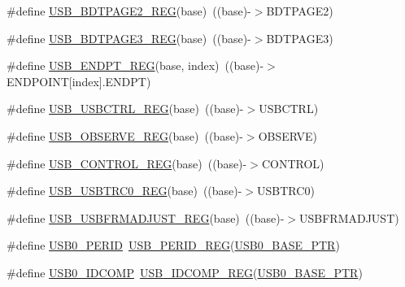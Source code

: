 \begin{DoxyCompactItemize}
\item 
\#define \hyperlink{group___u_s_b___register___accessor___macros_gab286bd6bd7c2c180c34f4d819bc6504e}{U\+S\+B\+\_\+\+B\+D\+T\+P\+A\+G\+E2\+\_\+\+R\+EG}(base)~((base)-\/$>$B\+D\+T\+P\+A\+G\+E2)
\item 
\#define \hyperlink{group___u_s_b___register___accessor___macros_ga608e340fcaa827bd85910ed2d058a322}{U\+S\+B\+\_\+\+B\+D\+T\+P\+A\+G\+E3\+\_\+\+R\+EG}(base)~((base)-\/$>$B\+D\+T\+P\+A\+G\+E3)
\item 
\#define \hyperlink{group___u_s_b___register___accessor___macros_ga93e8b132ffc209ad3ba99ba2cbf4f990}{U\+S\+B\+\_\+\+E\+N\+D\+P\+T\+\_\+\+R\+EG}(base,  index)~((base)-\/$>$E\+N\+D\+P\+O\+I\+NT\mbox{[}index\mbox{]}.E\+N\+D\+PT)
\item 
\#define \hyperlink{group___u_s_b___register___accessor___macros_ga7e767cbc19006f290fd3acb0bda4b0d7}{U\+S\+B\+\_\+\+U\+S\+B\+C\+T\+R\+L\+\_\+\+R\+EG}(base)~((base)-\/$>$U\+S\+B\+C\+T\+RL)
\item 
\#define \hyperlink{group___u_s_b___register___accessor___macros_gacf3b928d262722e221b19407d6fd1d4b}{U\+S\+B\+\_\+\+O\+B\+S\+E\+R\+V\+E\+\_\+\+R\+EG}(base)~((base)-\/$>$O\+B\+S\+E\+R\+VE)
\item 
\#define \hyperlink{group___u_s_b___register___accessor___macros_gae70ee8839acefd0aeb3e0c5129b59c76}{U\+S\+B\+\_\+\+C\+O\+N\+T\+R\+O\+L\+\_\+\+R\+EG}(base)~((base)-\/$>$C\+O\+N\+T\+R\+OL)
\item 
\#define \hyperlink{group___u_s_b___register___accessor___macros_gaff7c1525f5741bfe869a137149371c89}{U\+S\+B\+\_\+\+U\+S\+B\+T\+R\+C0\+\_\+\+R\+EG}(base)~((base)-\/$>$U\+S\+B\+T\+R\+C0)
\item 
\#define \hyperlink{group___u_s_b___register___accessor___macros_ga0c14a322173f3a4dbb3cc4ea025724ae}{U\+S\+B\+\_\+\+U\+S\+B\+F\+R\+M\+A\+D\+J\+U\+S\+T\+\_\+\+R\+EG}(base)~((base)-\/$>$U\+S\+B\+F\+R\+M\+A\+D\+J\+U\+ST)
\item 
\#define \hyperlink{group___u_s_b___register___accessor___macros_gabee4af6581d4520bd5d8d823d8668889}{U\+S\+B0\+\_\+\+P\+E\+R\+ID}~\hyperlink{group___u_s_b___register___accessor___macros_ga61c99097ee83a271dafdfb6b04980cc8}{U\+S\+B\+\_\+\+P\+E\+R\+I\+D\+\_\+\+R\+EG}(\hyperlink{group___u_s_b___peripheral_ga598ff5eb20a0551af232710b3f27640a}{U\+S\+B0\+\_\+\+B\+A\+S\+E\+\_\+\+P\+TR})
\item 
\#define \hyperlink{group___u_s_b___register___accessor___macros_gac5372cae1990fc1ac7c4e92cf5f02e62}{U\+S\+B0\+\_\+\+I\+D\+C\+O\+MP}~\hyperlink{group___u_s_b___register___accessor___macros_ga74152969f2622631ccd8ceccf72c4e7e}{U\+S\+B\+\_\+\+I\+D\+C\+O\+M\+P\+\_\+\+R\+EG}(\hyperlink{group___u_s_b___peripheral_ga598ff5eb20a0551af232710b3f27640a}{U\+S\+B0\+\_\+\+B\+A\+S\+E\+\_\+\+P\+TR})

\end{DoxyCompactItemize}
